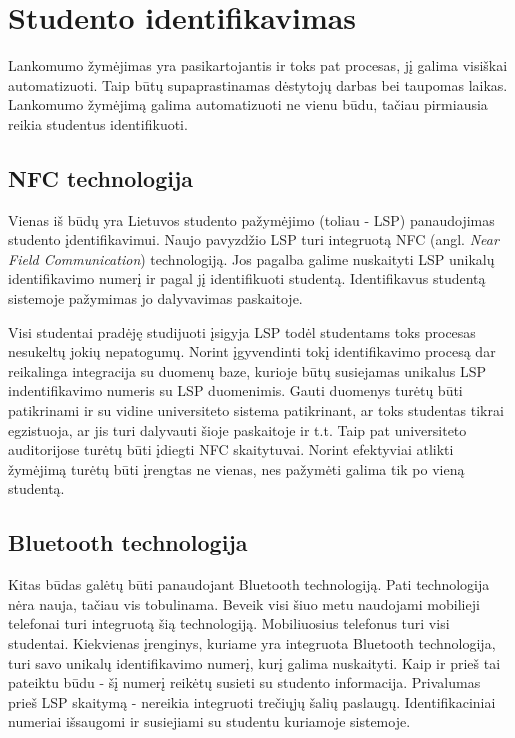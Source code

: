 \documentclass{VUMIFPSkursinis}
\begin{document}
\section{Studento identifikavimas}

Lankomumo žymėjimas yra pasikartojantis ir toks pat procesas, jį galima visiškai automatizuoti. Taip būtų supaprastinamas dėstytojų darbas bei taupomas laikas. Lankomumo žymėjimą galima automatizuoti ne vienu būdu, tačiau pirmiausia reikia studentus identifikuoti.

\subsection{NFC technologija}
Vienas iš būdų yra Lietuvos studento pažymėjimo (toliau - LSP) panaudojimas studento įdentifikavimui. Naujo pavyzdžio LSP turi integruotą NFC (angl. \textit{Near Field Communication}) technologiją.  Jos pagalba galime nuskaityti LSP unikalų identifikavimo numerį ir pagal jį identifikuoti studentą. Identifikavus studentą sistemoje pažymimas jo dalyvavimas paskaitoje.

Visi studentai pradėję studijuoti įsigyja LSP todėl studentams toks procesas nesukeltų jokių nepatogumų. Norint įgyvendinti tokį identifikavimo procesą dar reikalinga integracija su duomenų baze, kurioje būtų susiejamas unikalus LSP indentifikavimo numeris su LSP duomenimis. Gauti duomenys turėtų būti patikrinami ir su vidine universiteto sistema patikrinant, ar toks studentas tikrai egzistuoja, ar jis turi dalyvauti šioje paskaitoje ir t.t. Taip pat universiteto auditorijose turėtų būti įdiegti NFC skaitytuvai. Norint efektyviai atlikti žymėjimą turėtų būti įrengtas ne vienas, nes pažymėti galima tik po vieną studentą.

\subsection{Bluetooth technologija}
Kitas būdas galėtų būti panaudojant Bluetooth technologiją. Pati technologija nėra nauja, tačiau vis tobulinama. Beveik visi šiuo metu naudojami mobilieji telefonai turi integruotą šią technologiją. Mobiliuosius telefonus turi visi studentai. Kiekvienas įrenginys, kuriame yra integruota Bluetooth technologija, turi savo unikalų identifikavimo numerį, kurį galima nuskaityti. Kaip ir prieš tai pateiktu būdu - šį numerį reikėtų susieti su studento informacija. Privalumas prieš LSP skaitymą - nereikia integruoti trečiųjų šalių paslaugų. Identifikaciniai numeriai išsaugomi ir susiejiami su studentu kuriamoje sistemoje.
\end{document}
